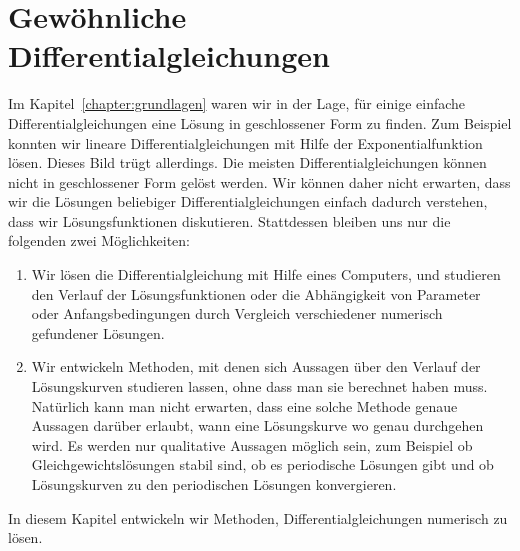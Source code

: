 %
%
%
\chapter{Gewöhnliche Differentialgleichungen\label{chapter:ode}}
\rhead{}
Im Kapitel~\ref{chapter:grundlagen} waren wir in der Lage, für einige
einfache Differentialgleichungen eine Lösung in geschlossener Form
zu finden.
Zum Beispiel konnten wir lineare Differentialgleichungen mit Hilfe
der Exponentialfunktion lösen.
Dieses Bild trügt allerdings.
Die meisten Differentialgleichungen können nicht in geschlossener
Form gelöst werden.
Wir können daher nicht erwarten, dass wir die Lösungen beliebiger
Differentialgleichungen einfach dadurch verstehen, dass wir
Lösungsfunktionen diskutieren.
Stattdessen bleiben uns nur die folgenden zwei Möglichkeiten:
\begin{enumerate}
\item
Wir lösen die Differentialgleichung mit Hilfe eines Computers,
und studieren den Verlauf der Lösungsfunktionen oder die Abhängigkeit
von Parameter oder Anfangsbedingungen durch Vergleich verschiedener
numerisch gefundener Lösungen.
\item
Wir entwickeln Methoden, mit denen sich Aussagen über den Verlauf der
Lösungskurven studieren lassen, ohne dass man sie berechnet haben muss.
Natürlich kann man nicht erwarten, dass eine solche Methode genaue
Aussagen darüber erlaubt, wann eine Lösungskurve wo genau durchgehen
wird.
Es werden nur qualitative Aussagen möglich sein, zum Beispiel ob
Gleichgewichtslösungen stabil sind, ob es periodische Lösungen gibt
und ob Lösungskurven zu den periodischen Lösungen konvergieren.
\end{enumerate}
In diesem Kapitel entwickeln wir Methoden, Differentialgleichungen 
numerisch zu lösen.









